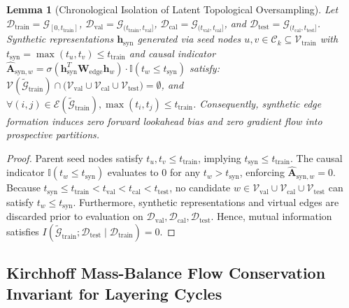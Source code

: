 \documentclass[journal,twoside]{IEEEtran}
\newtheorem{lemma}{Lemma}
\begin{document}
\begin{lemma}[Chronological Isolation of Latent Topological Oversampling]
\label{lem:graphsmote_causality}
Let $\mathcal{D}_{\text{train}} = \mathcal{G}_{[0, t_{\text{train}}]}$, $\mathcal{D}_{\text{val}} = \mathcal{G}_{(t_{\text{train}}, t_{\text{val}}]}$, $\mathcal{D}_{\text{cal}} = \mathcal{G}_{(t_{\text{val}}, t_{\text{cal}}]}$, and $\mathcal{D}_{\text{test}} = \mathcal{G}_{(t_{\text{cal}}, t_{\text{test}}]}$. Synthetic representations $\mathbf{h}_{\text{syn}}$ generated via seed nodes $u, v \in \mathcal{C}_k \subseteq \mathcal{V}_{\text{train}}$ with $t_{\text{syn}} = \max(t_u, t_v) \le t_{\text{train}}$ and causal indicator $\hat{\mathbf{A}}_{\text{syn}, w} = \sigma(\mathbf{h}_{\text{syn}}^T \mathbf{W}_{\text{edge}} \mathbf{h}_w) \cdot \mathbb{I}(t_w \le t_{\text{syn}})$ satisfy:
$\mathcal{V}(\tilde{\mathcal{G}}_{\text{train}}) \cap \big(\mathcal{V}_{\text{val}} \cup \mathcal{V}_{\text{cal}} \cup \mathcal{V}_{\text{test}}\big) = \emptyset$, and $\forall (i, j) \in \mathcal{E}(\tilde{\mathcal{G}}_{\text{train}}), \max(t_i, t_j) \le t_{\text{train}}$. Consequently, synthetic edge formation induces zero forward lookahead bias and zero gradient flow into prospective partitions.
\end{lemma}
\begin{proof}
Parent seed nodes satisfy $t_u, t_v \le t_{\text{train}}$, implying $t_{\text{syn}} \le t_{\text{train}}$. The causal indicator $\mathbb{I}(t_w \le t_{\text{syn}})$ evaluates to 0 for any $t_w > t_{\text{syn}}$, enforcing $\hat{\mathbf{A}}_{\text{syn}, w} = 0$. Because $t_{\text{syn}} \le t_{\text{train}} < t_{\text{val}} < t_{\text{cal}} < t_{\text{test}}$, no candidate $w \in \mathcal{V}_{\text{val}} \cup \mathcal{V}_{\text{cal}} \cup \mathcal{V}_{\text{test}}$ can satisfy $t_w \le t_{\text{syn}}$. Furthermore, synthetic representations and virtual edges are discarded prior to evaluation on $\mathcal{D}_{\text{val}}, \mathcal{D}_{\text{cal}}, \mathcal{D}_{\text{test}}$. Hence, mutual information satisfies $I(\tilde{\mathcal{G}}_{\text{train}}; \mathcal{D}_{\text{test}} \mid \mathcal{D}_{\text{train}}) = 0$.
\end{proof}

\subsection{Kirchhoff Mass-Balance Flow Conservation Invariant for Layering Cycles}
\end{document}
